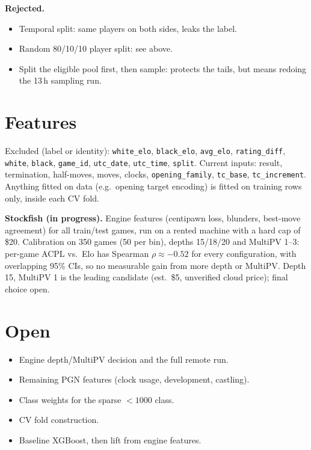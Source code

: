 \documentclass[11pt,a4paper]{article}
\begin{document}
\textbf{Rejected.}
\begin{itemize}
  \item Temporal split: same players on both sides, leaks the label.
  \item Random 80/10/10 player split: see above.
  \item Split the eligible pool first, then sample: protects the tails, but means
        redoing the 13\,h sampling run.
\end{itemize}

\section{Features}
Excluded (label or identity): \texttt{white\_elo}, \texttt{black\_elo},
\texttt{avg\_elo}, \texttt{rating\_diff}, \texttt{white}, \texttt{black},
\texttt{game\_id}, \texttt{utc\_date}, \texttt{utc\_time}, \texttt{split}.
Current inputs: result, termination, half-moves, moves, clocks,
\texttt{opening\_family}, \texttt{tc\_base}, \texttt{tc\_increment}.
Anything fitted on data (e.g.\ opening target encoding) is fitted on training
rows only, inside each CV fold.

\textbf{Stockfish (in progress).} Engine features (centipawn loss, blunders,
best-move agreement) for all train/test games, run on a rented machine with a
hard cap of \$20. Calibration on 350 games (50 per bin), depths 15/18/20 and
MultiPV 1--3: per-game ACPL vs.\ Elo has Spearman $\rho \approx -0.52$ for every
configuration, with overlapping 95\% CIs, so no measurable gain from more depth
or MultiPV. Depth 15, MultiPV 1 is the leading candidate (est.\ \$5, unverified
cloud price); final choice open.

\section{Open}
\begin{itemize}
  \item Engine depth/MultiPV decision and the full remote run.
  \item Remaining PGN features (clock usage, development, castling).
  \item Class weights for the sparse $<1000$ class.
  \item CV fold construction.
  \item Baseline XGBoost, then lift from engine features.
\end{itemize}
\end{document}
